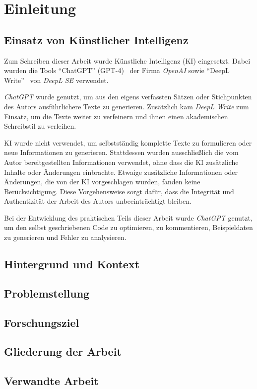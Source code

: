 \chapter{Einleitung}
\section{Einsatz von Künstlicher Intelligenz} %
Zum Schreiben dieser Arbeit wurde Künstliche Intelligenz (KI) eingesetzt.
Dabei wurden die Tools \enquote{ChatGPT} (GPT-4)~\cite{openai_chatgpt_nodate} der Firma \emph{OpenAI} sowie \enquote{DeepL Write}~\cite{deepl_se_deepl_nodate} von \emph{DeepL SE} verwendet.

\emph{ChatGPT} wurde genutzt, um aus den eigens verfassten Sätzen oder Stichpunkten des Autors ausführlichere Texte zu generieren.
Zusätzlich kam \emph{DeepL Write} zum Einsatz, um die Texte weiter zu verfeinern und ihnen einen akademischen Schreibstil zu verleihen.

KI wurde nicht verwendet, um selbstständig komplette Texte zu formulieren oder neue Informationen zu generieren.
Stattdessen wurden ausschließlich die vom Autor bereitgestellten Informationen verwendet, ohne dass die KI zusätzliche Inhalte oder Änderungen einbrachte.
Etwaige zusätzliche Informationen oder Änderungen, die von der KI vorgeschlagen wurden, fanden keine Berücksichtigung.
Diese Vorgehensweise sorgt dafür, dass die Integrität und Authentizität der Arbeit des Autors unbeeinträchtigt bleiben.

Bei der Entwicklung des praktischen Teils dieser Arbeit wurde \emph{ChatGPT} genutzt, um den selbst geschriebenen Code zu optimieren, zu kommentieren, Beispieldaten zu generieren und Fehler zu analysieren.
\section{Hintergrund und Kontext}
\section{Problemstellung}
\section{Forschungsziel}
\section{Gliederung der Arbeit}
\section{Verwandte Arbeit}

 